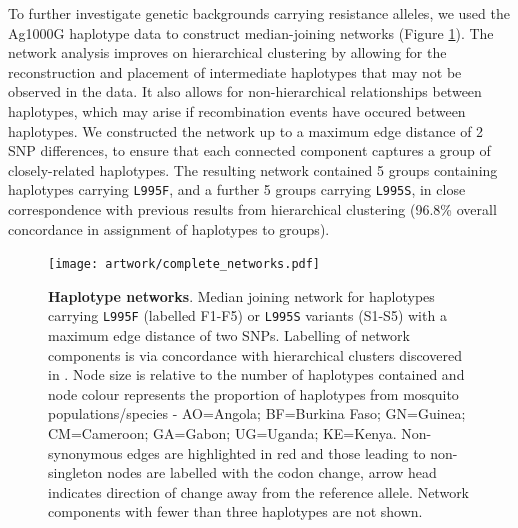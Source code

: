 \documentclass[a4paper,11pt,abstracton,hidelinks]{scrartcl}
\begin{document}
%
To further investigate genetic backgrounds carrying resistance alleles, we used the Ag1000G haplotype data to construct median-joining networks \cite{Bandelt1999} (Figure \ref{fig:networks}).
%
The network analysis improves on hierarchical clustering by allowing for the reconstruction and placement of intermediate haplotypes that may not be observed in the data.
%
It also allows for non-hierarchical relationships between haplotypes, which may arise if recombination events have occured between haplotypes.
%
We constructed the network up to a maximum edge distance of 2 SNP differences, to ensure that each connected component captures a group of closely-related haplotypes.
%
The resulting network contained 5 groups containing haplotypes carrying \texttt{L995F}, and a further 5 groups carrying \texttt{L995S}, in close correspondence with previous results from hierarchical clustering (96.8\% overall concordance in assignment of haplotypes to groups).
%


%
\begin{figure}[!t]
  \texttt{[image: artwork/complete\_networks.pdf]}
  \caption{\textbf{Haplotype networks}. Median joining network for haplotypes carrying \texttt{L995F} (labelled F1-F5) or \texttt{L995S} variants (S1-S5) with a maximum edge distance of two SNPs. Labelling of network components is via concordance with hierarchical clusters discovered in \cite{Ag1000gConsortium2017}. Node size is relative to the number of haplotypes contained and node colour represents the proportion of haplotypes from mosquito populations/species - AO=Angola; BF=Burkina Faso; GN=Guinea; CM=Cameroon; GA=Gabon; UG=Uganda; KE=Kenya. Non-synonymous edges are highlighted in red and those leading to non-singleton nodes are labelled with the codon change, arrow head indicates direction of change away from the reference allele. Network components with fewer than three haplotypes are not shown.}
  \label{fig:networks}
\end{figure}
\end{document}
